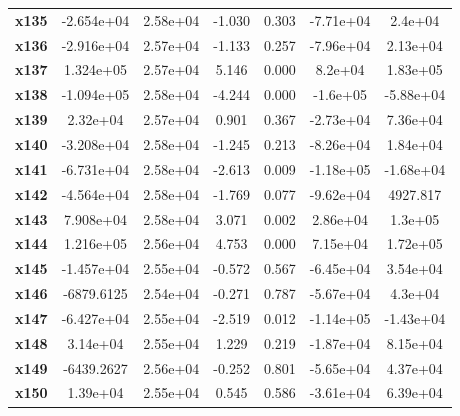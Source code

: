 \documentclass{article}
\begin{document}
\begin{center}
{\begin{tabular}{lcccccc}
\textbf{x135}  &   -2.654e+04  &     2.58e+04     &    -1.030  &         0.303        &    -7.71e+04    &      2.4e+04     \\
\textbf{x136}  &   -2.916e+04  &     2.57e+04     &    -1.133  &         0.257        &    -7.96e+04    &     2.13e+04     \\
\textbf{x137}  &    1.324e+05  &     2.57e+04     &     5.146  &         0.000        &      8.2e+04    &     1.83e+05     \\
\textbf{x138}  &   -1.094e+05  &     2.58e+04     &    -4.244  &         0.000        &     -1.6e+05    &    -5.88e+04     \\
\textbf{x139}  &     2.32e+04  &     2.57e+04     &     0.901  &         0.367        &    -2.73e+04    &     7.36e+04     \\
\textbf{x140}  &   -3.208e+04  &     2.58e+04     &    -1.245  &         0.213        &    -8.26e+04    &     1.84e+04     \\
\textbf{x141}  &   -6.731e+04  &     2.58e+04     &    -2.613  &         0.009        &    -1.18e+05    &    -1.68e+04     \\
\textbf{x142}  &   -4.564e+04  &     2.58e+04     &    -1.769  &         0.077        &    -9.62e+04    &     4927.817     \\
\textbf{x143}  &    7.908e+04  &     2.58e+04     &     3.071  &         0.002        &     2.86e+04    &      1.3e+05     \\
\textbf{x144}  &    1.216e+05  &     2.56e+04     &     4.753  &         0.000        &     7.15e+04    &     1.72e+05     \\
\textbf{x145}  &   -1.457e+04  &     2.55e+04     &    -0.572  &         0.567        &    -6.45e+04    &     3.54e+04     \\
\textbf{x146}  &   -6879.6125  &     2.54e+04     &    -0.271  &         0.787        &    -5.67e+04    &      4.3e+04     \\
\textbf{x147}  &   -6.427e+04  &     2.55e+04     &    -2.519  &         0.012        &    -1.14e+05    &    -1.43e+04     \\
\textbf{x148}  &     3.14e+04  &     2.55e+04     &     1.229  &         0.219        &    -1.87e+04    &     8.15e+04     \\
\textbf{x149}  &   -6439.2627  &     2.56e+04     &    -0.252  &         0.801        &    -5.65e+04    &     4.37e+04     \\
\textbf{x150}  &     1.39e+04  &     2.55e+04     &     0.545  &         0.586        &    -3.61e+04    &     6.39e+04     \\

\end{tabular}}
\end{center}
\end{document}
